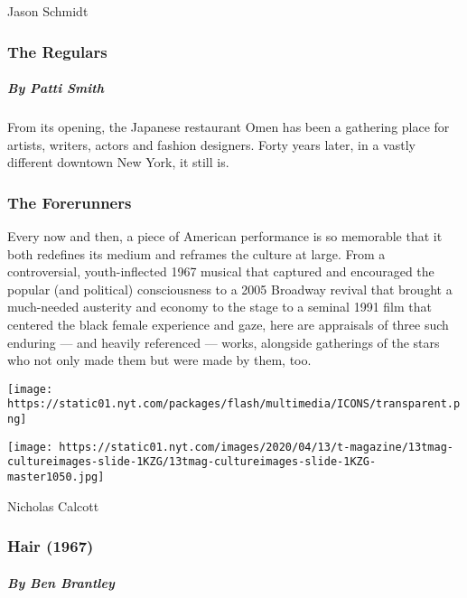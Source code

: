 Jason Schmidt

\hypertarget{the-regulars}{%
\subsubsection{The Regulars}\label{the-regulars}}

\hypertarget{by-patti-smith}{%
\subparagraph{By Patti Smith}\label{by-patti-smith}}

From its opening, the Japanese restaurant Omen has been a gathering
place for artists, writers, actors and fashion designers. Forty years
later, in a vastly different downtown New York, it still is.

\hypertarget{the-forerunners}{%
\subsubsection{The Forerunners}\label{the-forerunners}}

Every now and then, a piece of American performance is so memorable that
it both redefines its medium and reframes the culture at large. From a
controversial, youth-inflected 1967 musical that captured and encouraged
the popular (and political) consciousness to a 2005 Broadway revival
that brought a much-needed austerity and economy to the stage to a
seminal 1991 film that centered the black female experience and gaze,
here are appraisals of three such enduring --- and heavily referenced
--- works, alongside gatherings of the stars who not only made them but
were made by them, too.

\href{https://www.nytimes.com/interactive/2020/04/13/t-magazine/hair-musical-broadway.html}{}

\texttt{[image: https://static01.nyt.com/packages/flash/multimedia/ICONS/transparent.png]}

\texttt{[image: https://static01.nyt.com/images/2020/04/13/t-magazine/13tmag-cultureimages-slide-1KZG/13tmag-cultureimages-slide-1KZG-master1050.jpg]}

Nicholas Calcott

\hypertarget{hair-1967}{%
\subsubsection{Hair (1967)}\label{hair-1967}}

\hypertarget{by-ben-brantley}{%
\subparagraph{By Ben Brantley}\label{by-ben-brantley}}

\href{https://www.nytimes.com/interactive/2020/04/13/t-magazine/sweeney-todd-revival.html}{}

